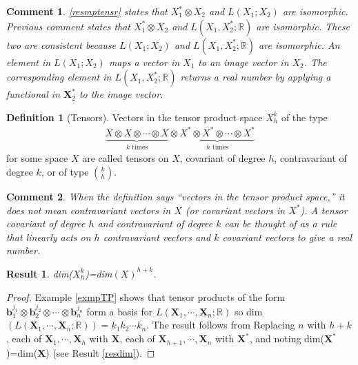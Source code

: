 \documentclass[letterpaper,12pt]{article}
\theoremstyle{plain}
\newtheorem{res}{Result}
\theoremstyle{plain}
\newtheorem*{cmnt*}{Comment}
\theoremstyle{definition}
\newtheorem{defn}{Definition}
\begin{document}
\begin{cmnt*} \autoref{resmptensr} states that $X_1^* \otimes X_2$ and $L(X_1;X_2)$ are isomorphic. Previous comment states that $X_1^* \otimes X_2$ and $L(X_1,X_2^*;\mathbb{R})$ are isomorphic. These two are consistent because $L(X_1;X_2)$ and $L(X_1,X_2^*;\mathbb{R})$ are isomorphic. An element in $L(X_1;X_2)$ maps a vector in $X_1$ to an image vector in $X_2$. The corresponding element in $L(X_1,X_2^*;\mathbb{R})$ returns a real number by applying a functional in $\mathbf{X}_2^*$ to the image vector.
\end{cmnt*}

\begin{defn}[Tensors]\label{deftnsr}
Vectors in the tensor product space $X_h^k$ of the type
\begin{align*}
\underbrace{X \otimes X \otimes \cdots \otimes X}_{k \text{ times}} \otimes \underbrace{X^* \otimes X^* \otimes \cdots \otimes X^*}_{h \text{ times}}
\end{align*}
for some space $X$ are called tensors on $X$, covariant of degree $h$, contravariant of degree $k$, or of type $\binom{k}{h}$.
\end{defn}

\begin{cmnt*} When the definition says ``vectors in the tensor product space,'' it does not mean contravariant vectors in $X$ (or covariant vectors in $X^*$). A tensor covariant of degree $h$ and contravariant of degree $k$ can be thought of as a rule that linearly acts on $h$ contravariant vectors and $k$ covariant vectors to give a real number.
\end{cmnt*}

\begin{res} dim($X_h^k$)=dim$(X)^{h+k}$.
\end{res}
\begin{proof}
Example \ref{exmpTP} shows that tensor products of the form $\mathbf{b}_1^{j_1}\otimes \mathbf{b}_2^{j_2}\otimes \cdots \otimes \mathbf{b}_n^{j_n}$ form a basis for $L(\mathbf{X}_1,\cdots,\mathbf{X}_n;\mathbb{R})$ so dim$(L(\mathbf{X}_1,\cdots,\mathbf{X}_n;\mathbb{R}))=k_1k_2\cdots k_n$. The result follows from Replacing $n$ with $h+k$, each of $\mathbf{X}_1,\cdots,\mathbf{X}_h$ with $\mathbf{X}$, each of $\mathbf{X}_{h+1},\cdots,\mathbf{X}_n$ with $\mathbf{X}^*$, and noting dim($\mathbf{X}^*$)=dim($\mathbf{X}$) (see Result \ref{resdim}).
\end{proof}
\end{document}
